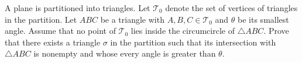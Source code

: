 A plane is partitioned into triangles. Let $\mathcal{T}_0$ denote the set of vertices of triangles in the partition. Let $ABC$ be a triangle with $A,B,C\in\mathcal{T}_0$ and $\theta$ be its smallest angle. Assume that no point of $\mathcal{T}_0$ lies inside the circumcircle of $\triangle ABC$. Prove that there exists a triangle $\sigma$ in the partition such that its intersection with $\triangle ABC$ is nonempty and whose every angle is greater than $\theta$.
